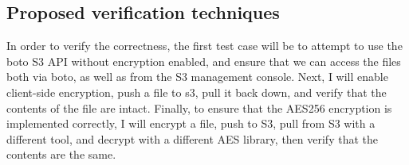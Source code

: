\subsection{Proposed verification techniques}
In order to verify the correctness, the first test case will be to attempt to use the boto S3 API without encryption enabled, and ensure that we can access the files both via boto, as well as from the S3 management console.
Next, I will enable client-side encryption, push a file to s3, pull it back down, and verify that the contents of the file are intact.
Finally, to ensure that the AES256 encryption is implemented correctly, I will encrypt a file, push to S3, pull from S3 with a different tool, and decrypt with a different AES library, then verify that the contents are the same.
